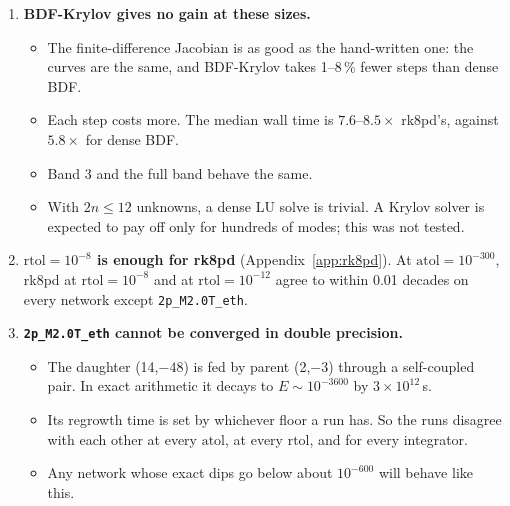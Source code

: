 \documentclass[10pt,a4paper]{article}
\newcommand{\atol}{\mathrm{atol}}
\newcommand{\rtol}{\mathrm{rtol}}
\begin{document}
\begin{enumerate}
    \item \textbf{BDF-Krylov gives no gain at these sizes.}
        \begin{itemize}
            \item The finite-difference Jacobian is as good as the hand-written one: the curves are the same, and BDF-Krylov takes 1--8\,\% fewer steps than dense BDF.
            \item Each step costs more. The median wall time is $7.6$--$8.5\times$ rk8pd's, against $5.8\times$ for dense BDF.
            \item Band 3 and the full band behave the same.
            \item With $2n\le12$ unknowns, a dense LU solve is trivial. A Krylov solver is expected to pay off only for hundreds of modes; this was not tested.
        \end{itemize}
    \item \textbf{$\rtol=10^{-8}$ is enough for rk8pd} (Appendix~\ref{app:rk8pd}). At $\atol=10^{-300}$, rk8pd at $\rtol=10^{-8}$ and at $\rtol=10^{-12}$ agree to within 0.01 decades on every network except \texttt{2p\_M2.0T\_eth}.
    \item \textbf{\texttt{2p\_M2.0T\_eth} cannot be converged in double precision.}
        \begin{itemize}
            \item The daughter (14,$-48$) is fed by parent (2,$-3$) through a self-coupled pair. In exact arithmetic it decays to $E\sim10^{-3600}$ by $3\times10^{12}$\,s.
            \item Its regrowth time is set by whichever floor a run has. So the runs disagree with each other at every $\atol$, at every $\rtol$, and for every integrator.
            \item Any network whose exact dips go below about $10^{-600}$ will behave like this.
        \end{itemize}
\end{enumerate}
\end{document}
